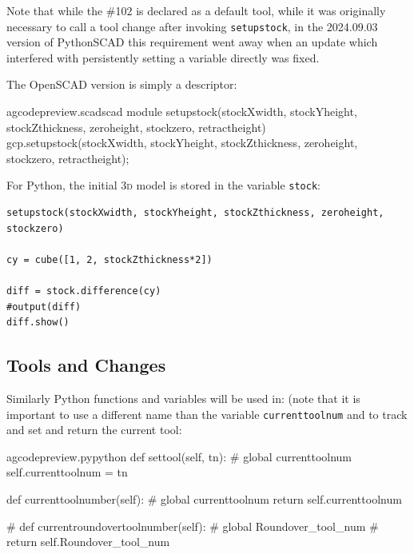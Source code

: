 \documentclass{ltxdoc}
\begin{document}
\addtocounter{gcpy}{54}

Note that while the \#102 is declared as a default tool, while it was originally necessary to call a tool change after invoking \verb|setupstock|, in the 2024.09.03 version of PythonSCAD this requirement went away when an update which interfered with persistently setting a variable directly was fixed.

The OpenSCAD version is simply a descriptor:

\lstset{firstnumber=\thegcpscad}
\begin{writecode}{a}{gcodepreview.scad}{scad}
module setupstock(stockXwidth, stockYheight, stockZthickness, zeroheight, stockzero, retractheight) {
    gcp.setupstock(stockXwidth, stockYheight, stockZthickness, zeroheight, stockzero, retractheight);
}

\end{writecode}
\addtocounter{gcpscad}{4}

For Python, the initial \textsc{3d} model is stored in the variable \verb|stock|:

\begin{verbatim}
setupstock(stockXwidth, stockYheight, stockZthickness, zeroheight, stockzero)

cy = cube([1, 2, stockZthickness*2])

diff = stock.difference(cy)
#output(diff)
diff.show()
\end{verbatim}

\subsection{Tools and Changes}
 
Similarly Python functions and variables will be used in:  (note that it is important to use a different name than the variable \verb|currenttoolnum| and  to track and set and return the current tool:

 
\lstset{firstnumber=\thegcpy}
\begin{writecode}{a}{gcodepreview.py}{python}
    def settool(self, tn):
#        global currenttoolnum
        self.currenttoolnum = tn

    def currenttoolnumber(self):
#        global currenttoolnum
        return self.currenttoolnum

#    def currentroundovertoolnumber(self):
#        global Roundover_tool_num
#        return self.Roundover_tool_num

\end{writecode}
\addtocounter{gcpy}{12}
\end{document}
